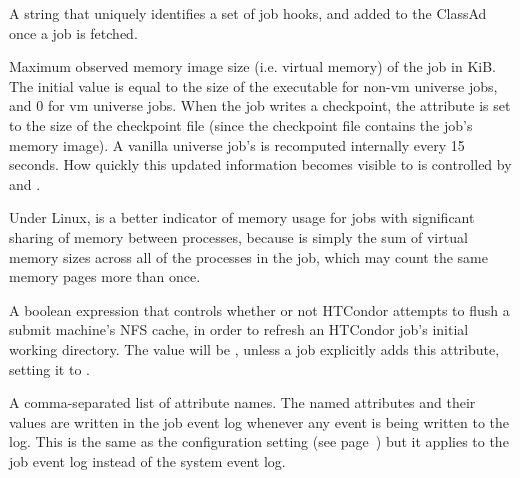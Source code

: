 \begin{description}
\item[\AdAttr{HookKeyword}:] A string that uniquely identifies
a set of job hooks, and added to the ClassAd once a job is fetched.

\item[\AdAttr{ImageSize}:]  Maximum observed memory image size
(i.e. virtual memory) of the
job in KiB.  The initial value is equal to the size of the
executable for non-vm universe jobs, and 0 for vm universe jobs.
When the job writes a checkpoint, the 
attribute is set to the size of the checkpoint file (since the
checkpoint file contains the job's memory image).
A vanilla universe job's  is recomputed
internally every 15 seconds.
How quickly this updated information becomes visible to  is
controlled by  and
.

Under Linux,  is a better indicator of
memory usage for jobs with significant sharing of memory between
processes, because  is simply the sum of virtual
memory sizes across all of the processes in the job, which may count
the same memory pages more than once.

\label{IwdFlushNFSCache-job-attribute}
\item[\AdAttr{IwdFlushNFSCache}:]  A boolean expression that controls
whether or not HTCondor attempts to flush a submit machine's NFS cache,
in order to refresh an HTCondor job's initial working directory.
The value will be , unless a job explicitly adds this
attribute, setting it to .

\label{JobAdInformationAttrs-job-attribute}
\item[\AdAttr{JobAdInformationAttrs}:] A comma-separated list
of attribute names.  The named attributes and their values are written
in the job event log whenever any event is being written to the log.
This is the same as the configuration setting
 (see
page~\pageref{param:EventLogJobAdInformationAttrs}) but it applies to
the job event log instead of the system event log.


\end{description}
